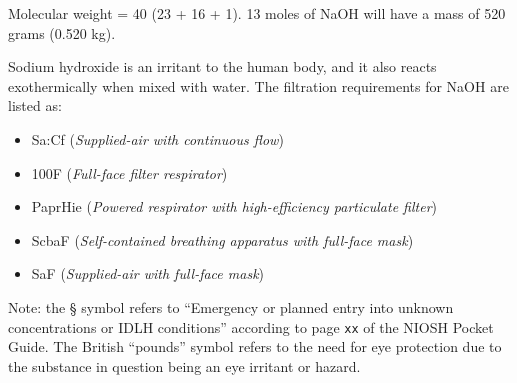 Molecular weight = 40 (23 + 16 + 1).  13 moles of NaOH will have a mass of 520 grams (0.520 kg).

\vskip 10pt

Sodium hydroxide is an irritant to the human body, and it also reacts exothermically when mixed with water.  The filtration requirements for NaOH are listed as:

\begin{itemize}
\item{} Sa:Cf ({\it Supplied-air with continuous flow})
\item{} 100F ({\it Full-face filter respirator})
\item{} PaprHie ({\it Powered respirator with high-efficiency particulate filter})
\item{} ScbaF ({\it Self-contained breathing apparatus with full-face mask})
\item{} SaF ({\it Supplied-air with full-face mask})
\end{itemize}

Note: the \S{} symbol refers to ``Emergency or planned entry into unknown concentrations or IDLH conditions'' according to page {\tt xx} of the NIOSH Pocket Guide.  The British ``pounds'' symbol refers to the need for eye protection due to the substance in question being an eye irritant or hazard.




